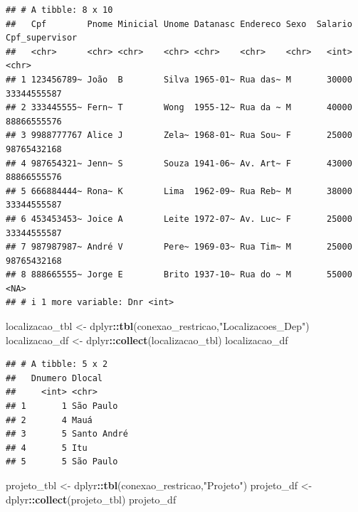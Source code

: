 \documentclass[
]{article}
\newenvironment{Shaded}{\begin{snugshade}}{\end{snugshade}}
\newcommand{\FunctionTok}[1]{\textcolor[rgb]{0.13,0.29,0.53}{\textbf{#1}}}
\newcommand{\NormalTok}[1]{#1}
\newcommand{\OtherTok}[1]{\textcolor[rgb]{0.56,0.35,0.01}{#1}}
\newcommand{\SpecialCharTok}[1]{\textcolor[rgb]{0.81,0.36,0.00}{\textbf{#1}}}
\newcommand{\StringTok}[1]{\textcolor[rgb]{0.31,0.60,0.02}{#1}}
\begin{document}
\begin{verbatim}
## # A tibble: 8 x 10
##   Cpf        Pnome Minicial Unome Datanasc Endereco Sexo  Salario Cpf_supervisor
##   <chr>      <chr> <chr>    <chr> <chr>    <chr>    <chr>   <int> <chr>         
## 1 123456789~ João  B        Silva 1965-01~ Rua das~ M       30000 33344555587   
## 2 333445555~ Fern~ T        Wong  1955-12~ Rua da ~ M       40000 88866555576   
## 3 9988777767 Alice J        Zela~ 1968-01~ Rua Sou~ F       25000 98765432168   
## 4 987654321~ Jenn~ S        Souza 1941-06~ Av. Art~ F       43000 88866555576   
## 5 666884444~ Rona~ K        Lima  1962-09~ Rua Reb~ M       38000 33344555587   
## 6 453453453~ Joice A        Leite 1972-07~ Av. Luc~ F       25000 33344555587   
## 7 987987987~ André V        Pere~ 1969-03~ Rua Tim~ M       25000 98765432168   
## 8 888665555~ Jorge E        Brito 1937-10~ Rua do ~ M       55000 <NA>          
## # i 1 more variable: Dnr <int>
\end{verbatim}

\begin{Shaded}
\begin{Highlighting}[]
\NormalTok{localizacao\_tbl }\OtherTok{\textless{}{-}}\NormalTok{ dplyr}\SpecialCharTok{::}\FunctionTok{tbl}\NormalTok{(conexao\_restricao,}\StringTok{"Localizacoes\_Dep"}\NormalTok{)}
\NormalTok{localizacao\_df }\OtherTok{\textless{}{-}}\NormalTok{ dplyr}\SpecialCharTok{::}\FunctionTok{collect}\NormalTok{(localizacao\_tbl)}
\NormalTok{localizacao\_df}
\end{Highlighting}
\end{Shaded}

\begin{verbatim}
## # A tibble: 5 x 2
##   Dnumero Dlocal     
##     <int> <chr>      
## 1       1 São Paulo  
## 2       4 Mauá       
## 3       5 Santo André
## 4       5 Itu        
## 5       5 São Paulo
\end{verbatim}

\begin{Shaded}
\begin{Highlighting}[]
\NormalTok{projeto\_tbl }\OtherTok{\textless{}{-}}\NormalTok{ dplyr}\SpecialCharTok{::}\FunctionTok{tbl}\NormalTok{(conexao\_restricao,}\StringTok{"Projeto"}\NormalTok{)}
\NormalTok{projeto\_df }\OtherTok{\textless{}{-}}\NormalTok{ dplyr}\SpecialCharTok{::}\FunctionTok{collect}\NormalTok{(projeto\_tbl)}
\NormalTok{projeto\_df}
\end{Highlighting}
\end{Shaded}
\end{document}
